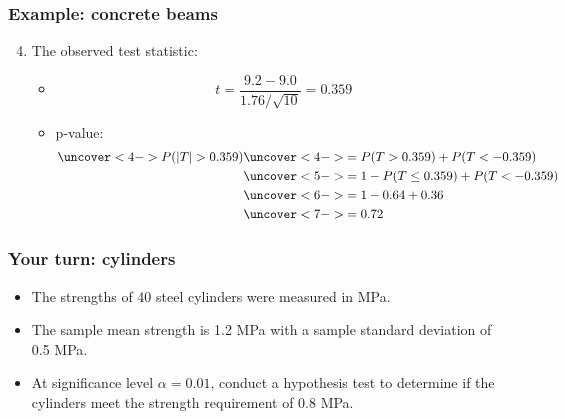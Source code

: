 \documentclass[handout]{beamer}\usepackage[]{graphicx}\usepackage[]{color}
\numberwithin{equation}{section}
\begin{document}
\begin{frame}
\frametitle{Example: concrete beams}
\begin{enumerate}
\setcounter{enumi}{3}
\item The observed test statistic:
\begin{itemize}
\pause \item \[t = \frac{9.2 -  9.0}{1.76/\sqrt{10}} = 0.359\]
\pause \item  p-value:
\begin{align*}
\uncover<4->{ P(|T| > 0.359)} & \uncover<4->{= P(T > 0.359) + P(T < -0.359)} \\
& \uncover<5->{= 1 - P(T \le 0.359) + P(T < -0.359)} \\
&\uncover<6->{= 1 - 0.64 + 0.36} \\
&\uncover<7->{= 0.72}
\end{align*}
\end{itemize}
\end{enumerate}
\end{frame}







\begin{frame}
\frametitle{Your turn: cylinders}
\begin{itemize}
\item The strengths of 40 steel cylinders were measured in MPa. 
\pause \item The sample mean strength is 1.2 MPa with a sample standard deviation of 0.5 MPa.
\pause \item At significance level $\alpha = 0.01$, conduct a hypothesis test to determine if the cylinders meet the strength requirement of 0.8 MPa.
\end{itemize}
\end{frame}
\end{document}
